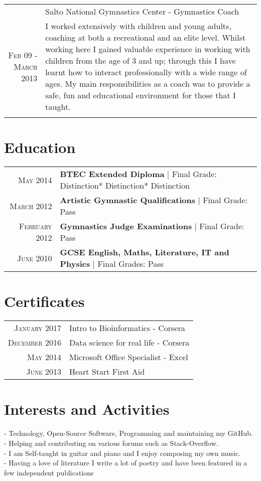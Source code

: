\documentclass[a4paper,10pt]{article}
\begin{document}
\begin{longtable}{r|p{11cm}}
  &Salto National Gymnastics Center - Gymnastics Coach \\\textsc{Feb 09 - March 2013}
  &\footnotesize{I worked extensively with children and young adults, coaching at both a recreational and an elite level. Whilst working here I gained valuable experience in working with children from the age of 3 and up; through this I have learnt how to interact professionally with a wide range of ages. My main responsibilities as a coach was to provide a safe, fun and educational environment for those that I taught.}\\\multicolumn{2}{c}{} \\
\end{longtable}

\section{Education}
\begin{tabular}{rl}	
  \textsc{May} 2014& \textbf{BTEC Extended Diploma} | Final Grade: Distinction* Distinction* Distinction
  \\
  \textsc{March} 2012& \textbf{Artistic Gymnastic Qualifications} | Final Grade: Pass
  \\
  \textsc{February} 2012& \textbf{Gymnastics Judge Examinations} | Final Grade: Pass
  \\
  \textsc{June} 2010& \textbf{GCSE English, Maths, Literature, IT and Physics} | Final Grades: Pass
\end{tabular}


\section{Certificates}
\begin{tabular}{rl}
  \textsc{January} 2017 & Intro to Bioinformatics  - Corsera \\
  \textsc{December} 2016 & Data science for real life - Corsera \\
  \textsc{May} 2014 & Microsoft Office Specialist - Excel\\
  \textsc{June} 2013 & Heart Start First Aid 
\end{tabular}


\section{Interests and Activities}
- Technology, Open-Source Software, Programming and 
maintaining my GitHub.\\
- Helping and contributing on various forums such as Stack-Overflow.\\
- I am Self-taught in guitar and piano and I enjoy composing my own music.\\
- Having a love of literature I write a lot of poetry and have been featured in a few independent  publications 
\end{document}
